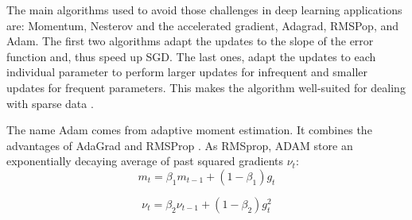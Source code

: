 The main algorithms used to avoid those challenges in deep learning applications are: Momentum, Nesterov and the accelerated gradient, Adagrad, RMSPop, and Adam. The first two algorithms adapt the updates to the slope of the error function and, thus speed up SGD. The last ones, adapt the updates to each individual parameter to perform larger updates for infrequent and smaller updates for frequent parameters. This makes the algorithm well-suited for dealing with sparse data \cite{ruder2016overview}.




  
The name Adam comes from adaptive moment estimation. It combines the advantages of AdaGrad and RMSProp \cite{kingma2014adam}. As RMSprop, ADAM  store an exponentially decaying average of past squared gradients $\nu_t$: %
\begin{equation}
m_t=\beta_1 m_{t-1} + (1-\beta_1)g_t
\end{equation}

\begin{equation}
\nu_t=\beta_2 \nu_{t-1} + (1-\beta_2)g^2_t
\end{equation}

